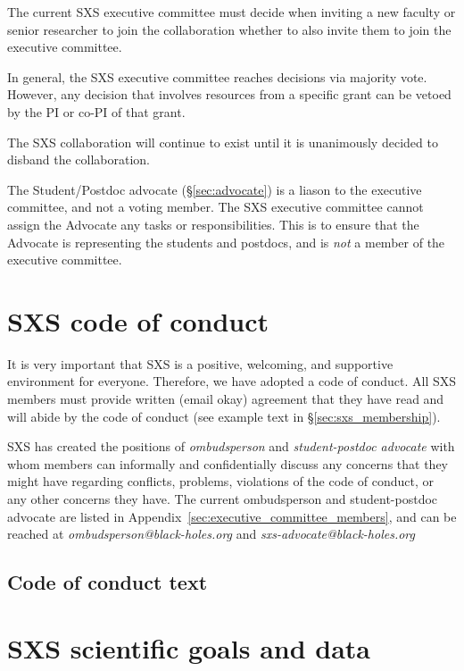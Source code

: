 \documentclass[12pt]{article}
\begin{document}
The current SXS executive committee must decide when inviting a new
faculty or senior researcher to join the collaboration whether to
also invite them to join the executive committee.

In general, the SXS executive committee reaches decisions via majority
vote.  However, any decision that involves resources from a specific
grant can be vetoed by the PI or co-PI of that grant.

The SXS collaboration will continue to exist until it is unanimously
decided to disband the collaboration.

The Student/Postdoc advocate (\S\ref{sec:advocate}) is a liason to the
executive committee, and not a voting member.  The SXS executive
committee cannot assign the Advocate any tasks or
responsibilities. This is to ensure that the Advocate is representing
the students and postdocs, and is \textit{not} a member of the
executive committee.

\section{SXS code of conduct}\label{sec:code_of_conduct}

It is very important that SXS is a positive, welcoming, and supportive
environment for everyone.  Therefore, we have adopted a code of
conduct.  All SXS members must provide written (email okay) agreement
that they have read and will abide by the code of conduct (see example
text in \S\ref{sec:sxs_membership}).

SXS has created the positions of \emph{ombudsperson} and
\emph{student-postdoc advocate} with whom members can informally and
confidentially discuss any concerns that they might have regarding
conflicts, problems, violations of the code of conduct, or any other
concerns they have.  The current ombudsperson and student-postdoc
advocate are listed in Appendix~\ref{sec:executive_committee_members},
and can be reached at \emph{ombudsperson@black-holes.org} and
\emph{sxs-advocate@black-holes.org}

\subsection{Code of conduct text}



\section{SXS scientific goals and data}\label{sec:goals_and_data}
\end{document}

